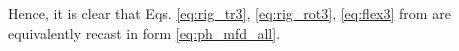 \documentclass{svjour3}                     %
\begin{document}
Hence, it is clear that Eqs. \eqref{eq:rig_tr3}, \eqref{eq:rig_rot3}, \eqref{eq:flex3} from \cite{MB_Daepde,simeon2013computational} are equivalently recast in form \eqref{eq:ph_mfd_all}.
%
 

\end{document}
